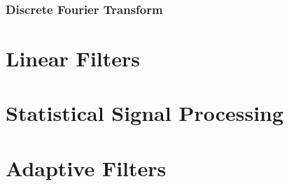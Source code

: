 \subsubsection{Discrete Fourier Transform}


\section{Linear Filters}


\section{Statistical Signal Processing}



\section{Adaptive Filters}
